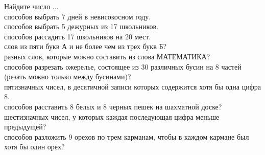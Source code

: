 \documentclass[a4paper,12pt]{article}
\begin{document}

Найдите число ...
\\
способов выбрать 7 дней в невисокосном году.
\\
способов выбрать 5 дежурных из 17 школьников.
\\
способов рассадить 17 школьников на 20 мест.
\\
слов из пяти букв А и не более чем из трех букв Б?
\\
разных слов, которые можно составить из слова МАТЕМАТИКА?
\\
способов разрезать ожерелье, состоящее из 30 различных бусин на 8 частей (резать можно только между бусинами)?
\\
пятизначных чисел, в десятичной записи которых содержится хотя бы одна цифра 8.
\\
способов расставить 8 белых и 8 черных пешек на шахматной доске?
\\
шестизначных чисел, у которых каждая последующая цифра меньше предыдущей?
\\
способов разложить 9 орехов по трем карманам, чтобы в каждом кармане был хотя бы один орех?
\end{document}
